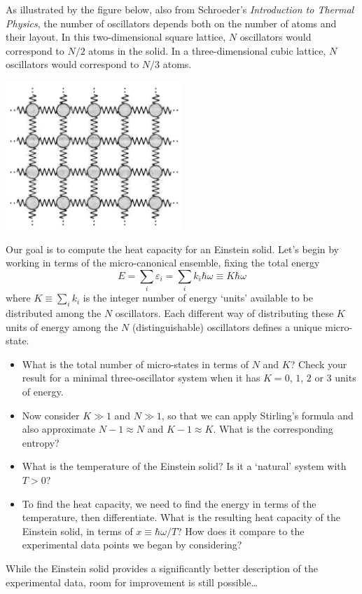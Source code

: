 \documentclass[12 pt]{article} %
\newcommand{\eps}{\ensuremath{\varepsilon} }
\newcommand{\om}{\ensuremath{\omega} }
\begin{document}
As illustrated by the figure below, also from Schroeder's \textit{Introduction to Thermal Physics}, the number of oscillators depends both on the number of atoms and their layout.
In this two-dimensional square lattice, $N$ oscillators would correspond to $N / 2$ atoms in the solid.
In a three-dimensional cubic lattice, $N$ oscillators would correspond to $N / 3$ atoms. \\[-24 pt]
\begin{center}\includegraphics[width=0.5\textwidth]{figs/solid.pdf}\end{center}

Our goal is to compute the heat capacity for an Einstein solid.
Let's begin by working in terms of the micro-canonical ensemble, fixing the total energy
\begin{equation*}
  E = \sum_i \eps_i = \sum_i k_i\hbar\om \equiv K\hbar\om
\end{equation*}
where $K \equiv \sum_i k_i$ is the integer number of energy `units' available to be distributed among the $N$ oscillators.
Each different way of distributing these $K$ units of energy among the $N$ (distinguishable) oscillators defines a unique micro-state.

\begin{itemize}
  \item What is the total number of micro-states in terms of $N$ and $K$?
        Check your result for a minimal three-oscillator system when it has $K = 0$, $1$, $2$ or $3$ units of energy.

  \item Now consider $K \gg 1$ and $N \gg 1$, so that we can apply Stirling's formula and also approximate $N - 1 \approx N$ and $K - 1 \approx K$.
        What is the corresponding entropy?

  \item What is the temperature of the Einstein solid?
        Is it a `natural' system with $T > 0$?

  \item To find the heat capacity, we need to find the energy in terms of the temperature, then differentiate.
        What is the resulting heat capacity of the Einstein solid, in terms of $x \equiv \hbar \om / T$?
        How does it compare to the experimental data points we began by considering?
\end{itemize}

While the Einstein solid provides a significantly better description of the experimental data, room for improvement is still possible\dots
\end{document}
